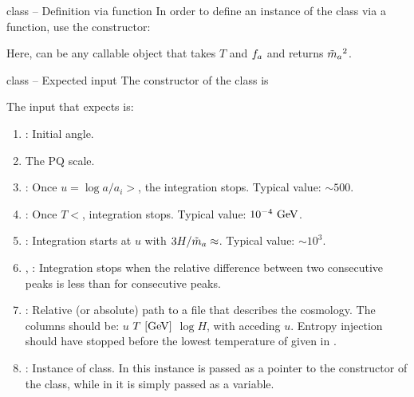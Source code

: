 \documentclass[10pt,utf8,compress,xcolor=dvipsnames]{beamer}
\begin{document}
\begin{frame}{ class -- Definition via function}
	\fontB
	In order to define an instance of the  class via a function, use the constructor:
	\lstset{language = c++}
		
	
	Here,  can be any callable object that takes $T$ and $f_{a}{}$ and returns $\tilde m_{a}{}^2$.
\end{frame}





\begin{frame}{ class -- Expected input}
	\fontB
	The constructor of the  class is
	\lstset{language = c++}
	
	
	The input that \mimes expects is:
	\begin{enumerate}
		\item {}:  Initial angle. 
		\item {}  The PQ scale.
		\item {}:  Once $u=\log a/a_i>$, the integration stops. Typical value: $\sim 500$.
		\item {}:  Once $T<$, integration stops. Typical value: $10^{-4}~{\rm GeV}$.
		\item {}: Integration starts at $u$ with $3H/\tilde m_{a}{} \approx$. Typical value: $\sim 10^{3}$.
		\item {}, : Integration stops when  the relative difference 
		between two consecutive peaks  is less than  for  
		consecutive peaks.
		\item {}: Relative (or absolute) path to a file that describes the cosmology. The columns should be: $u$ $T ~[{\rm GeV}]$ $\log H$, with acceding $u$. Entropy injection should have stopped before the lowest temperature of given in .
		\item {}: Instance of  class. In \CPP this instance is passed as a pointer to the constructor
		of the  class, while in \PY it is simply passed as a variable.
	\end{enumerate}
	
\end{frame}
\end{document}
